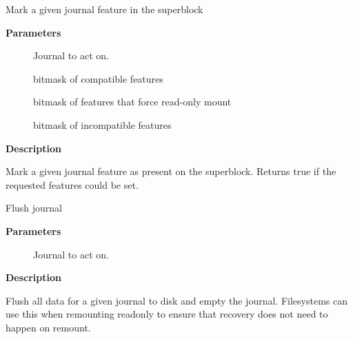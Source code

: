 \documentclass[a4paper,8pt,english]{sphinxmanual}
\begin{document}
\begin{fulllineitems}
\label{filesystems/index:c.jbd2_journal_set_features}
Mark a given journal feature in the superblock

\end{fulllineitems}


\textbf{Parameters}
\begin{description}
\item[{}] \leavevmode
Journal to act on.

\item[{}] \leavevmode
bitmask of compatible features

\item[{}] \leavevmode
bitmask of features that force read-only mount

\item[{}] \leavevmode
bitmask of incompatible features

\end{description}

\textbf{Description}

Mark a given journal feature as present on the
superblock.  Returns true if the requested features could be set.

\begin{fulllineitems}
\label{filesystems/index:c.jbd2_journal_flush}
Flush journal

\end{fulllineitems}


\textbf{Parameters}
\begin{description}
\item[{}] \leavevmode
Journal to act on.

\end{description}

\textbf{Description}

Flush all data for a given journal to disk and empty the journal.
Filesystems can use this when remounting readonly to ensure that
recovery does not need to happen on remount.
\end{document}
